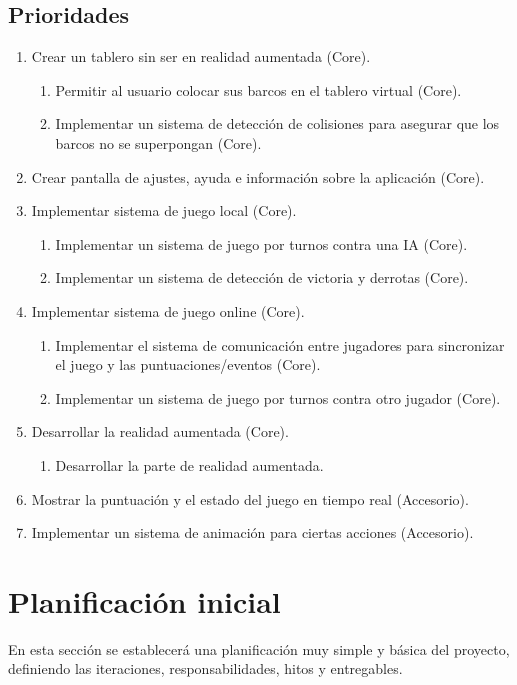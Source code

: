 \documentclass[a4paper, openright, 12pt]{article}
\begin{document}
\subsection{Prioridades}
\begin{enumerate}
    \item Crear un tablero sin ser en realidad aumentada (Core).
        \begin{enumerate}
            \item Permitir al usuario colocar sus barcos en el tablero virtual (Core).
            \item Implementar un sistema de detección de colisiones para asegurar que los barcos no se superpongan (Core).
        \end{enumerate}
    \item Crear pantalla de ajustes, ayuda e información sobre la aplicación (Core).
    \item Implementar sistema de juego local (Core).
        \begin{enumerate}
            \item Implementar un sistema de juego por turnos contra una IA (Core).
            \item Implementar un sistema de detección de victoria y derrotas (Core).
         \end{enumerate}
    \item Implementar sistema de juego online (Core).
        \begin{enumerate}
            \item Implementar el sistema de comunicación entre jugadores para sincronizar el juego y las puntuaciones/eventos (Core).
            \item Implementar un sistema de juego por turnos contra otro jugador (Core).
        \end{enumerate}
    \item Desarrollar la realidad aumentada (Core).
        \begin{enumerate}
            \item Desarrollar la parte de realidad aumentada.
        \end{enumerate}
    \item Mostrar la puntuación y el estado del juego en tiempo real (Accesorio).
    \item Implementar un sistema de animación para ciertas acciones (Accesorio).
\end{enumerate}

\section{Planificación inicial}
En esta sección se establecerá una planificación muy simple y básica del proyecto, definiendo las iteraciones, responsabilidades, hitos y entregables.
\end{document}
